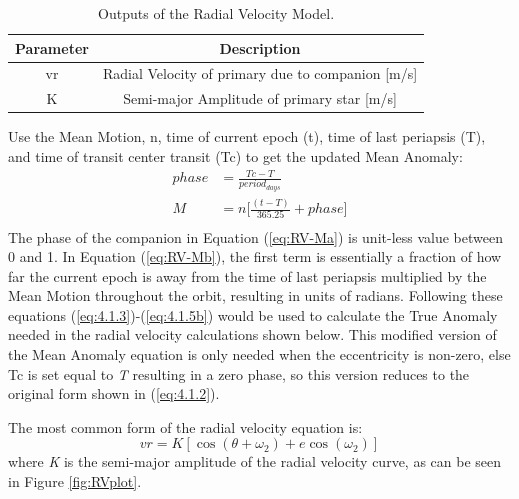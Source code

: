 \documentclass[12pt,preprint]{aastex}
\begin{document}

\begin{table}[h]
\centering
\caption{ Outputs of the Radial Velocity Model.}
\begin{tabular}{c c}
\hline\hline
Parameter & Description \\
\hline
vr & Radial Velocity of primary due to companion [m/s] \\
K & Semi-major Amplitude of primary star [m/s]\\
\hline
\end{tabular}
\end{table}

\pagebreak

Use the Mean Motion, n, time of current epoch (t), time of last periapsis (T), and time of transit center transit (Tc) to get the updated Mean Anomaly:
\begin{subequations}\label{eq:RV-Ma}
\begin{align}
phase& = \frac{Tc-T}{period_{days}} \\
\label{eq:RV-Mb}
M& = n \bigg[ \frac{(t-T)}{365.25} +phase \bigg]\\
\end{align}
\end{subequations}
The phase of the companion in Equation (\ref{eq:RV-Ma}) is unit-less value between 0 and 1.  In Equation (\ref{eq:RV-Mb}), the first term is essentially a fraction of how far the current epoch is away from the time of last periapsis multiplied by the Mean Motion throughout the orbit, resulting in units of radians.  Following these equations (\ref{eq:4.1.3})-(\ref{eq:4.1.5b}) would be used to calculate the True Anomaly needed in the radial velocity calculations shown below.  This modified version of the Mean Anomaly equation is only needed when the eccentricity is non-zero, else Tc is set equal to {\it T} resulting in a zero phase, so this version reduces to the original form shown in (\ref{eq:4.1.2}).

The most common form of the radial velocity equation is:
\begin{equation}\label{eq:rvStandard}
vr =  K[\cos(\theta+\omega_2)+e \cos(\omega_2)]
\end{equation}
where {\it K} is the semi-major amplitude of the radial velocity curve, as can be seen in Figure \ref{fig:RVplot}.
\end{document}
